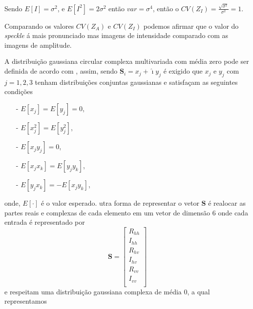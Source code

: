 Sendo $E[I]=\sigma^2$, e $E[I^2]=2\sigma^2$ então $var=\sigma^4$, então o $CV(Z_I)=\frac{\sqrt{\sigma^2}}{\sigma^2}=1$. 

Comparando os valores $CV(Z_A)$ e $CV(Z_I)$ podemos afirmar que o valor do \textit{speckle} á mais pronunciado mas imagens de intensidade comparado com as imagens de amplitude.

A distribuição gaussiana circular complexa multivariada com média zero pode ser definida de acordo com \citet{goodman}, assim, sendo $\mathbf{S}_i= x_j+\hat{\imath}y_j$ é exigido que $x_j$ e $y_j$ com $j=1,2,3$ tenham distribuições conjuntas gaussianas e satisfaçam as seguintes condições 
\begin{itemize}
	\item[-] $E[x_j]=E[y_j]=0$,
	\item[-] $E[x_j^2]=E[y_j^2]$,
	\item[-] $E[x_jy_j]=0$,
	\item[-] $E[x_jx_k]=E[y_jy_k]$,
	\item[-] $E[y_jx_k]=-E[x_jy_k]$,
\end{itemize}
onde, $E[\cdot]$ é o valor esperado.
utra forma de representar o vetor $\mathbf{S}$ é realocar as partes reais e complexas de cada elemento em um vetor de dimensão $6$ onde cada entrada é representado por
\begin{equation}
\mathbf{S} = \left[
\begin{array}{c}
	R_{hh}     \\
    I_{hh}     \\
	R_{hv}     \\
	I_{hv}     \\
    R_{vv}     \\
	I_{vv}     \\
\end{array}
\right]
\end{equation}
e respeitam uma distribuição gaussiana complexa de média 0, a qual representamos 

